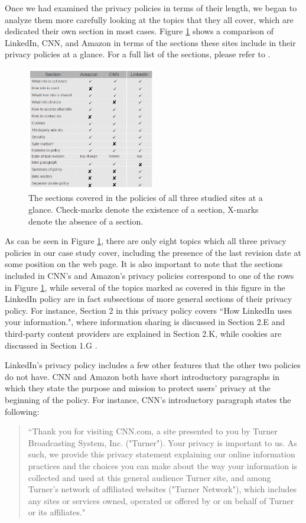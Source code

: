 \documentclass{acm_proc_article-sp}
\begin{document}
Once we had examined the privacy policies in terms of their length, we began to analyze them more carefully looking at the topics that they all cover, which are dedicated their own section in most cases. Figure \ref{fig:at-a-glance} shows a comparison of LinkedIn, CNN, and Amazon in terms of the sections these sites include in their privacy policies at a glance. For a full list of the sections, please refer to \cite{amazon,linkedin,cnn}.

\begin{figure} 
\centering
\includegraphics[width=0.5\textwidth]{at-a-glance}
\caption{The sections covered in the policies of all three studied sites at a glance. Check-marks denote the existence of a section, X-marks denote the absence of a section.}
\label{fig:at-a-glance}
\end{figure}

As can be seen in Figure \ref{fig:at-a-glance}, there are only eight topics which all three privacy policies in our case study cover, including the presence of the last revision date at some position on the web page. It is also important to note that the sections included in CNN's and Amazon's privacy policies correspond to one of the rows in Figure \ref{fig:at-a-glance}, while several of the topics marked as covered in this figure in the LinkedIn policy are in fact subsections of more general sections of their privacy policy. For instance, Section 2 in this privacy policy covers ``How LinkedIn uses your information.", where information sharing is discussed in Section 2.E and third-party content providers are explained in Section 2.K, while cookies are discussed in Section 1.G \cite{linkedin}.

LinkedIn's privacy policy includes a few other features that the other two policies do not have. CNN and Amazon both have short introductory paragraphs in which they state the purpose and mission to protect users' privacy at the beginning of the policy. For instance, CNN's introductory paragraph states the following: 
\begin{quotation}``Thank you for visiting CNN.com, a site presented to you by Turner Broadcasting System, Inc. ("Turner"). Your privacy is important to us. As such, we provide this privacy statement explaining our online information practices and the choices you can make about the way your information is collected and used at this general audience Turner site, and among Turner's network of affiliated websites ("Turner Network"), which includes any sites or services owned, operated or offered by or on behalf of Turner or its affiliates." \cite{cnn}\end{quotation}
\end{document}
